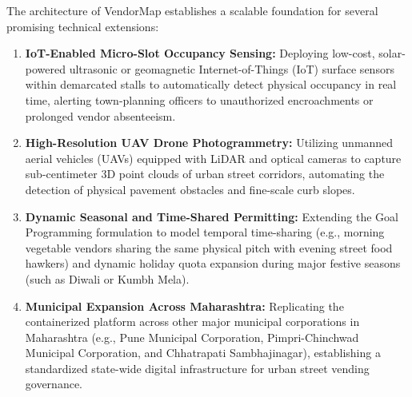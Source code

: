 The architecture of VendorMap establishes a scalable foundation for several promising technical extensions:

\begin{enumerate}
    \item \textbf{IoT-Enabled Micro-Slot Occupancy Sensing:} Deploying low-cost, solar-powered ultrasonic or geomagnetic Internet-of-Things (IoT) surface sensors within demarcated stalls to automatically detect physical occupancy in real time, alerting town-planning officers to unauthorized encroachments or prolonged vendor absenteeism.
    \item \textbf{High-Resolution UAV Drone Photogrammetry:} Utilizing unmanned aerial vehicles (UAVs) equipped with LiDAR and optical cameras to capture sub-centimeter 3D point clouds of urban street corridors, automating the detection of physical pavement obstacles and fine-scale curb slopes.
    \item \textbf{Dynamic Seasonal and Time-Shared Permitting:} Extending the Goal Programming formulation to model temporal time-sharing (e.g., morning vegetable vendors sharing the same physical pitch with evening street food hawkers) and dynamic holiday quota expansion during major festive seasons (such as Diwali or Kumbh Mela).
    \item \textbf{Municipal Expansion Across Maharashtra:} Replicating the containerized platform across other major municipal corporations in Maharashtra (e.g., Pune Municipal Corporation, Pimpri-Chinchwad Municipal Corporation, and Chhatrapati Sambhajinagar), establishing a standardized state-wide digital infrastructure for urban street vending governance.
\end{enumerate}

